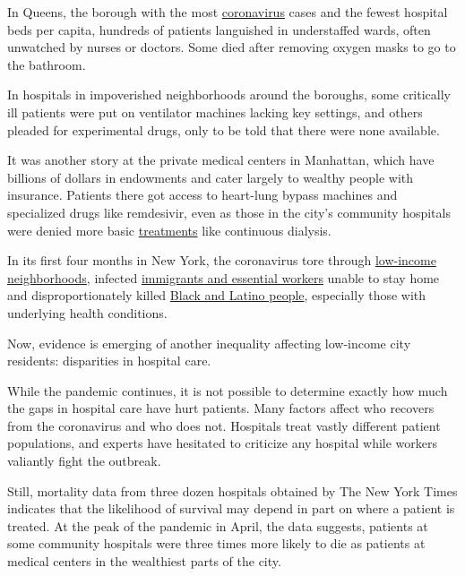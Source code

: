 In Queens, the borough with the most
\href{https://www.nytimes3xbfgragh.onion/2020/07/27/podcasts/the-daily/new-york-hospitals-covid.html}{coronavirus}
cases and the fewest hospital beds per capita, hundreds of patients
languished in understaffed wards, often unwatched by nurses or doctors.
Some died after removing oxygen masks to go to the bathroom.

In hospitals in impoverished neighborhoods around the boroughs, some
critically ill patients were put on ventilator machines lacking key
settings, and others pleaded for experimental drugs, only to be told
that there were none available.

It was another story at the private medical centers in Manhattan, which
have billions of dollars in endowments and cater largely to wealthy
people with insurance. Patients there got access to heart-lung bypass
machines and specialized drugs like remdesivir, even as those in the
city's community hospitals were denied more basic
\href{https://www.nytimes3xbfgragh.onion/2020/07/20/world/covid-19-treatment-synairgen-interferon-beta.html}{treatments}
like continuous dialysis.

In its first four months in New York, the coronavirus tore through
\href{https://www.nytimes3xbfgragh.onion/2020/05/18/nyregion/coronavirus-deaths-nyc.html}{low-income
neighborhoods}, infected
\href{https://www.nytimes3xbfgragh.onion/2020/04/09/nyregion/coronavirus-queens-corona-jackson-heights-elmhurst.html}{immigrants
and essential workers} unable to stay home and disproportionately killed
\href{https://www.nytimes3xbfgragh.onion/2020/04/08/nyregion/coronavirus-race-deaths.html}{Black
and Latino people}, especially those with underlying health conditions.

Now, evidence is emerging of another inequality affecting low-income
city residents: disparities in hospital care.

While the pandemic continues, it is not possible to determine exactly
how much the gaps in hospital care have hurt patients. Many factors
affect who recovers from the coronavirus and who does not. Hospitals
treat vastly different patient populations, and experts have hesitated
to criticize any hospital while workers valiantly fight the outbreak.

Still, mortality data from three dozen hospitals obtained by The New
York Times indicates that the likelihood of survival may depend in part
on where a patient is treated. At the peak of the pandemic in April, the
data suggests, patients at some community hospitals were three times
more likely to die as patients at medical centers in the wealthiest
parts of the city.

